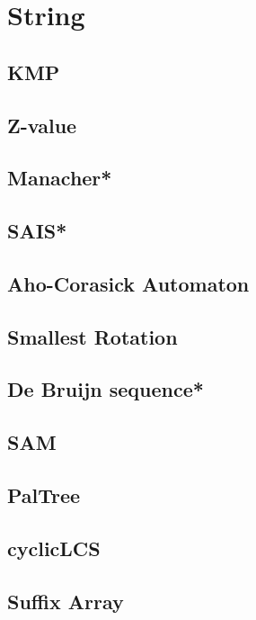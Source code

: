 \section{String}
\subsection{KMP}

\subsection{Z-value}

\subsection{Manacher*} %

\subsection{SAIS*}

\subsection{Aho-Corasick Automaton}

\subsection{Smallest Rotation}

\subsection{De Bruijn sequence*} %

\subsection{SAM}

\subsection{PalTree}

\subsection{cyclicLCS}

\subsection{Suffix Array}

